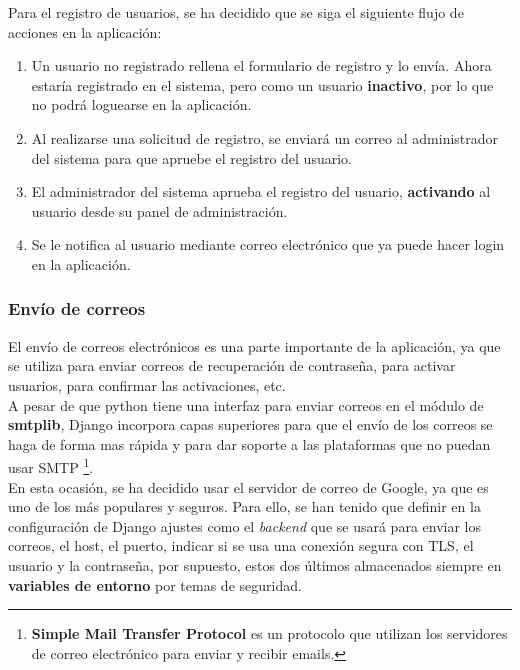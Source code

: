 Para el registro de usuarios, se ha decidido que se siga el siguiente flujo de acciones en
la aplicación:

    \begin{enumerate}
        \item Un usuario no registrado rellena el formulario de registro y lo envía. Ahora
        estaría registrado en el sistema, pero como un usuario \textbf{inactivo}, por lo
        que no podrá loguearse en la aplicación.
        \item Al realizarse una solicitud de registro, se enviará un correo al administrador
        del sistema para que apruebe el registro del usuario.
        \item El administrador del sistema aprueba el registro del usuario, \textbf{activando}
        al usuario desde su panel de administración.
        \item Se le notifica al usuario mediante correo electrónico que ya puede hacer login
        en la aplicación.
    \end{enumerate}

\subsubsection{Envío de correos} \label{subsubsec:send-mails}
El envío de correos electrónicos es una parte importante de la aplicación, ya que se
utiliza para enviar correos de recuperación de contraseña, para activar usuarios, para
confirmar las activaciones, etc.\\

A pesar de que python tiene una interfaz para enviar correos en el módulo de
\textbf{smtplib}, Django incorpora capas superiores para que el envío de los correos se
haga de forma mas rápida y para dar soporte a las plataformas que no puedan usar SMTP
\footnote{\textbf{Simple Mail Transfer Protocol} es un protocolo que utilizan los servidores
de correo electrónico para enviar y recibir emails.}.\\

En esta ocasión, se ha decidido usar el servidor de correo de Google, ya que es uno de los
más populares y seguros. Para ello, se han tenido que definir en la configuración de
Django ajustes como el \textit{backend} que se usará para enviar los correos, el host, el
puerto, indicar si se usa una conexión segura con TLS, el usuario y la contraseña, por
supuesto, estos dos últimos almacenados siempre en \textbf{variables de entorno} por temas
de seguridad.\\

